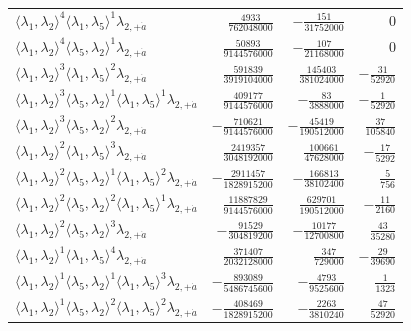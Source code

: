 \begin{longtable}{@{}lrrr@{}}
$\langle\lambda_1,\lambda_2\rangle^{4}\langle\lambda_1,\lambda_5\rangle^{1}\lambda_{2,+\dot a}$ & $\frac{4933}{762048000}$ & $-\frac{151}{31752000}$ & $0$ \\
$\langle\lambda_1,\lambda_2\rangle^{4}\langle\lambda_5,\lambda_2\rangle^{1}\lambda_{2,+\dot a}$ & $\frac{50893}{9144576000}$ & $-\frac{107}{21168000}$ & $0$ \\
$\langle\lambda_1,\lambda_2\rangle^{3}\langle\lambda_1,\lambda_5\rangle^{2}\lambda_{2,+\dot a}$ & $\frac{591839}{3919104000}$ & $\frac{145403}{381024000}$ & $-\frac{31}{52920}$ \\
$\langle\lambda_1,\lambda_2\rangle^{3}\langle\lambda_5,\lambda_2\rangle^{1}\langle\lambda_1,\lambda_5\rangle^{1}\lambda_{2,+\dot a}$ & $\frac{409177}{9144576000}$ & $-\frac{83}{3888000}$ & $-\frac{1}{52920}$ \\
$\langle\lambda_1,\lambda_2\rangle^{3}\langle\lambda_5,\lambda_2\rangle^{2}\lambda_{2,+\dot a}$ & $-\frac{710621}{9144576000}$ & $-\frac{45419}{190512000}$ & $\frac{37}{105840}$ \\
$\langle\lambda_1,\lambda_2\rangle^{2}\langle\lambda_1,\lambda_5\rangle^{3}\lambda_{2,+\dot a}$ & $\frac{2419357}{3048192000}$ & $\frac{100661}{47628000}$ & $-\frac{17}{5292}$ \\
$\langle\lambda_1,\lambda_2\rangle^{2}\langle\lambda_5,\lambda_2\rangle^{1}\langle\lambda_1,\lambda_5\rangle^{2}\lambda_{2,+\dot a}$ & $-\frac{2911457}{1828915200}$ & $-\frac{166813}{38102400}$ & $\frac{5}{756}$ \\
$\langle\lambda_1,\lambda_2\rangle^{2}\langle\lambda_5,\lambda_2\rangle^{2}\langle\lambda_1,\lambda_5\rangle^{1}\lambda_{2,+\dot a}$ & $\frac{11887829}{9144576000}$ & $\frac{629701}{190512000}$ & $-\frac{11}{2160}$ \\
$\langle\lambda_1,\lambda_2\rangle^{2}\langle\lambda_5,\lambda_2\rangle^{3}\lambda_{2,+\dot a}$ & $-\frac{91529}{304819200}$ & $-\frac{10177}{12700800}$ & $\frac{43}{35280}$ \\
$\langle\lambda_1,\lambda_2\rangle^{1}\langle\lambda_1,\lambda_5\rangle^{4}\lambda_{2,+\dot a}$ & $\frac{371407}{2032128000}$ & $\frac{347}{729000}$ & $-\frac{29}{39690}$ \\
$\langle\lambda_1,\lambda_2\rangle^{1}\langle\lambda_5,\lambda_2\rangle^{1}\langle\lambda_1,\lambda_5\rangle^{3}\lambda_{2,+\dot a}$ & $-\frac{893089}{5486745600}$ & $-\frac{4793}{9525600}$ & $\frac{1}{1323}$ \\
$\langle\lambda_1,\lambda_2\rangle^{1}\langle\lambda_5,\lambda_2\rangle^{2}\langle\lambda_1,\lambda_5\rangle^{2}\lambda_{2,+\dot a}$ & $-\frac{408469}{1828915200}$ & $-\frac{2263}{3810240}$ & $\frac{47}{52920}$ \\

\end{longtable}
